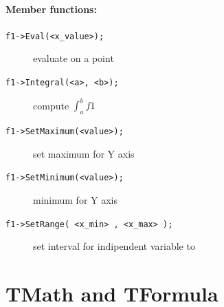 \documentclass[10pt, twoside]{article}
\newcommand{\ttt}[1]{\colorbox{boxgray}{\texttt{#1}}}
\begin{document}
\paragraph{Member functions:}
\begin{description}
\item[\ttt{f1->Eval(<x\_value>);}] evaluate on a point
\item[\ttt{f1->Integral(<a>, <b>);}] compute $\displaystyle \int_a^b f1$
\item[\ttt{f1->SetMaximum(<value>);}] set maximum for Y axis
\item[\ttt{f1->SetMinimum(<value>);}] minimum for Y axis
\item[\ttt{f1->SetRange( <x\_min> , <x\_max> );}] set interval for indipendent variable to \ttt{}
\end{description}

\newpage
\section{TMath and TFormula}
\end{document}
